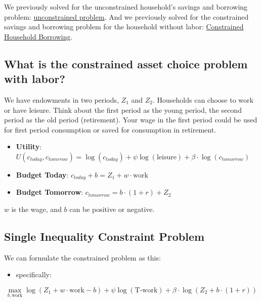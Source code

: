 \documentclass[
]{book}
\providecommand{\tightlist}{%
  \setlength{\itemsep}{0pt}\setlength{\parskip}{0pt}}
\begin{document}
We previously solved for the unconstrained household's savings and
borrowing problem: \href{https://math4econ.github.io/derivative_application/K_save_households.html}{unconstrained
problem}.
And we previously solved for the constrained savings and borrowing
problem for the household without labor: \href{https://math4econ.github.io/opti_hh_constrained_brsv_inequality/household_borrow_constrained.html}{Constrained Household
Borrowing}.

\hypertarget{what-is-the-constrained-asset-choice-problem-with-labor}{%
\subsection{What is the constrained asset choice problem with labor?}\label{what-is-the-constrained-asset-choice-problem-with-labor}}

We have endowments in two periods, \(Z_1\) and \(Z_2\). Households can
choose to work or have leisure. Think about the first period as the
young period, the second period as the old period (retirement). Your
wage in the first period could be used for first period consumption or
saved for consumption in retirement.

\begin{itemize}
\item
  \textbf{Utility}:
  \(U(c_{today} ,c_{tomrrow} )=\log (c_{today} )+\psi \log (\textrm{leisure})+\beta \cdot \log (c_{tomorrow} )\)
\item
  \textbf{Budget Today}: \(c_{today} +b=Z_1 +w\cdot \textrm{work}\)
\item
  \textbf{Budget Tomorrow}: \(c_{tomorrow} =b\cdot (1+r)+Z_2\)
\end{itemize}

\(w\) is the wage, and \(b\) can be positive or negative.

\hypertarget{single-inequality-constraint-problem}{%
\subsection{Single Inequality Constraint Problem}\label{single-inequality-constraint-problem}}

We can formulate the constrained problem as this:

\begin{itemize}
\tightlist
\item
  specifically:
\end{itemize}

\[\max_{b,\textrm{work}} \log (Z_1 +w\cdot \textrm{work}-b)+\psi \log (\textrm{T}\textrm{-}\textrm{work})+\beta \cdot \log (Z_2 +b\cdot (1+r))\]
\end{document}

